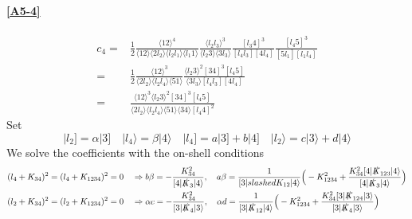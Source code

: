 \paragraph{\ref{A5-4}}
\begin{equation*}
\begin{split}
c_4 = & \frac{1}{2}\frac{\langle 12 \rangle^4}{\langle 12 \rangle\langle 2l_2 \rangle\langle l_2 l_1 \rangle\langle l_1 1 \rangle}
\frac{\langle l_2 l_3 \rangle^3}{\langle l_2 3 \rangle \langle 3 l_3 \rangle}
\frac{[l_3 4 ]^3}{[l_4 l_3][4 l_4]}
\frac{[l_4 5]^3}{[5l_1][l_1 l_4]}
\\
= &
\frac{1}{2}\frac{\langle 12 \rangle^3}{\langle 2l_2\rangle\langle l_2 l_4 \rangle\langle 51 \rangle}
\frac{\langle l_2 3 \rangle^2 [34]^3 [l_4 5]}{\langle 3 l_3 \rangle [l_4 l_3][4 l_4]}
\\
= &
\frac{\langle 12 \rangle^3\langle l_2 3\rangle^2[34]^3[l_4 5]}{\langle 2 l_2 \rangle\langle l_2 l_4 \rangle\langle 51 \rangle\langle 34 \rangle [l_4 4]^2}
\end{split}
\end{equation*}
Set
\begin{equation*}
|l_2] = \alpha|3] \quad
|l_4\rangle = \beta|4\rangle \quad
|l_4] = a|3] + b|4] \quad
|l_2\rangle = c|3\rangle + d|4\rangle
\end{equation*}
We solve the coefficients with the on-shell conditions
\begin{equation*}
\begin{split}
& (l_4 + K_{34})^2 = (l_4 +K_{1234})^2 = 0 \quad\Rightarrow
b\beta = -\frac{K_{34}^2}{[4|\slashed{K}_3|4\rangle} ,\quad
a\beta = \frac{1}{[3|slashed{K}_{12}|4\rangle}\Big( -K_{1234}^2 + \frac{K_{34}^2 [4|\slashed{K}_{123}|4\rangle}{[4|\slashed{K}_3|4\rangle}\Big)
\\
&
(l_2 + K_{34})^2 = (l_2 + K_{1234})^2 = 0 \quad\Rightarrow
\alpha c = -\frac{K_{34}^2}{[3|\slashed{K}_4|3\rangle} ,\quad
\alpha d = \frac{1}{[3|\slashed{K}_{12}|4\rangle}\Big(-K_{1234}^2 + \frac{K_{34}^2 [3|\slashed{K}_{124}|3\rangle}{[3|\slashed{K}_4|3\rangle}\Big)
\end{split}
\end{equation*}
